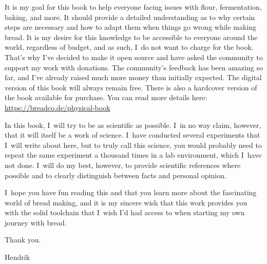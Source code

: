 It is my goal for this book to help everyone facing issues with flour, fermentation, baking,
and more. It should provide a detailed understanding as to why certain steps are necessary
and how to adapt them when things go wrong while making bread.
It is my desire for this knowledge to be accessible to everyone around the world, regardless
of budget, and as such, I~do not want to charge for the book. That's why I've decided to make
it open source and have asked the community to support my work with
donations. The community's feedback has been amazing so far, and
I've already raised much more money than initially expected. The digital version of this book
will always remain free. There is also a hardcover version of the book available for purchase.
You can read more details here: \url{https://breadco.de/physical-book}

In this book, I~will try to be as scientific as possible. I~in no way claim, however, that
it will itself be a work of science. I~have conducted several experiments that I~will write
about here, but to truly call this science, you would probably need to repeat the same experiment
a thousand times in a lab environment, which I~have not done. I~will do my best, however, to provide
scientific references where possible and to clearly distinguish between facts and personal opinion.

I~hope you have fun reading this and that you learn more about the fascinating world of bread
making, and it is my sincere wish that this work provides you with the solid toolchain that I~wish
I'd had access to when starting my own journey with bread.

Thank you.

Hendrik
